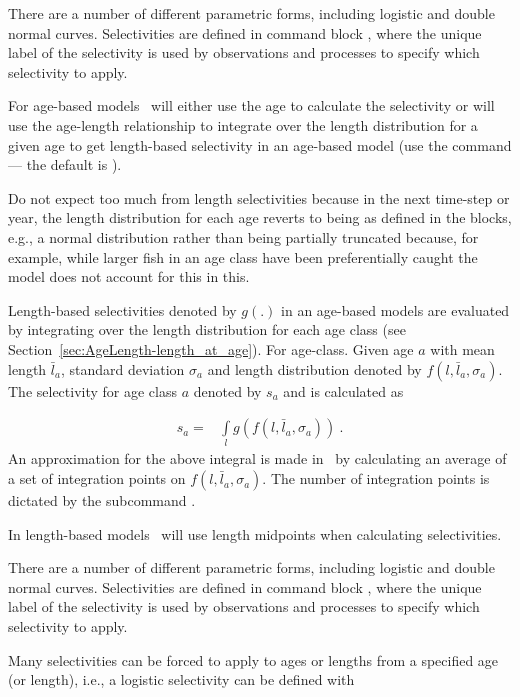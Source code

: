 There are a number of different parametric forms, including logistic and double normal curves. Selectivities are defined in command block , where the unique label of the selectivity is used by observations and processes to specify which selectivity to apply.

\ifAgeBased
For age-based models \CNAME\ will either use the age to calculate the selectivity or will use the age-length relationship to integrate over the length distribution for a given age to get length-based selectivity in an age-based model (use the command  --- the default is ). 

Do not expect too much from length selectivities because in the next time-step or year, the length distribution for each age reverts to being as defined in the  blocks, e.g., a normal distribution rather than being partially truncated because, for example, while larger fish in an age class have been preferentially caught the model does not account for this in this.

Length-based selectivities denoted by \(g(.)\) in an age-based models are evaluated by integrating over the length distribution for each age class (see Section~\ref{sec:AgeLength-length_at_age}). For age-class. Given age \(a\) with mean length \(\bar{l}_a\), standard deviation \(\sigma_a\) and length distribution denoted by \(f(l,\bar{l}_a, \sigma_a)\). The selectivity for age class \(a\) denoted by \(s_a\) and is calculated as

\begin{align*}
	s_a = & \int\limits_l g(f(l,\bar{l}_a, \sigma_a)) \ .
\end{align*}
%
An approximation for the above integral is made in \CNAME\ by calculating an average of a set of integration points on \(f(l,\bar{l}_a, \sigma_a)\). The number of integration points is dictated by the subcommand .

\else
In length-based models \CNAME\ will use length midpoints when calculating selectivities. 
\fi %

There are a number of different parametric forms, including logistic and double normal curves. Selectivities are defined in command block , where the unique label of the selectivity is used by observations and processes to specify which selectivity to apply.

Many selectivities can be forced to apply to ages or lengths from a specified age (or length), i.e., a logistic selectivity 
 can be defined with


